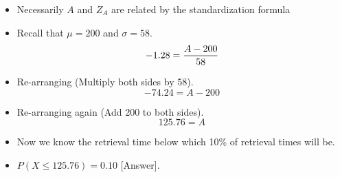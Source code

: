 \documentclass[a4paper,12pt]{article}
\begin{document}
	\begin{itemize}
		\item Necessarily $A$ and $Z_A$ are related by the standardization formula
		\item Recall that $\mu = 200$ and $\sigma = 58$.
		\[ -1.28  = {A - 200 \over 58} \]
		\item Re-arranging (Multiply both sides by 58).
		\[ -74.24  = A - 200 \]
		\item Re-arranging again (Add 200 to both sides).
		\[ 125.76 =  A \]

		\item Now we know the retrieval time below which 10\% of retrieval times will be.
		\item $P(X \leq 125.76) = 0.10$ [Answer].
	\end{itemize}
\end{document}
